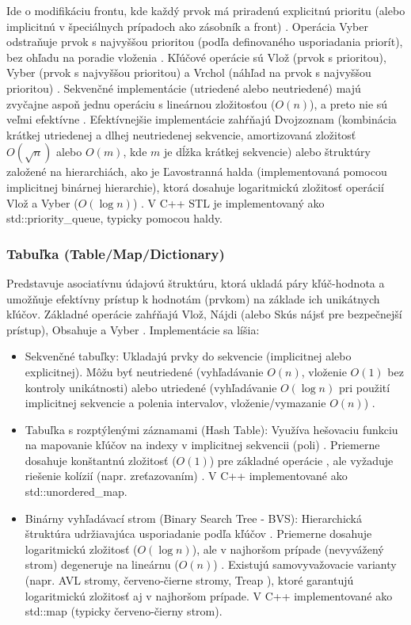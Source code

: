 \documentclass[11pt]{article}
\begin{document}
Ide o modifikáciu frontu, kde každý prvok má priradenú explicitnú prioritu (alebo implicitnú v špeciálnych prípadoch ako zásobník a front) \cite{aus3}. Operácia Vyber odstraňuje prvok s najvyššou prioritou (podľa definovaného usporiadania priorít), bez ohľadu na poradie vloženia \cite{aus3}. Kľúčové operácie sú Vlož (prvok s prioritou), Vyber (prvok s najvyššou prioritou) a Vrchol (náhľad na prvok s najvyššou prioritou) \cite{aus3}. Sekvenčné implementácie (utriedené alebo neutriedené) majú zvyčajne aspoň jednu operáciu s lineárnou zložitosťou ($O(n)$), a preto nie sú veľmi efektívne \cite{aus3}. Efektívnejšie implementácie zahŕňajú Dvojzoznam (kombinácia krátkej utriedenej a dlhej neutriedenej sekvencie, amortizovaná zložitosť $O(\sqrt{n})$ alebo $O(m)$, kde $m$ je dĺžka krátkej sekvencie) \cite{aus3} alebo štruktúry založené na hierarchiách, ako je Ľavostranná halda (implementovaná pomocou implicitnej binárnej hierarchie), ktorá dosahuje logaritmickú zložitosť operácií Vlož a Vyber ($O(\log n)$) \cite{aus3}. V C++ STL je implementovaný ako std::priority\_queue, typicky pomocou haldy.

\subsubsection{Tabuľka (Table/Map/Dictionary)}

Predstavuje asociatívnu údajovú štruktúru, ktorá ukladá páry kľúč-hodnota a umožňuje efektívny prístup k hodnotám (prvkom) na základe ich unikátnych kľúčov. Základné operácie zahŕňajú Vlož, Nájdi (alebo Skús nájsť pre bezpečnejší prístup), Obsahuje a Vyber \cite{aus3}. Implementácie sa líšia:
  \begin{itemize}
    \item Sekvenčné tabuľky: Ukladajú prvky do sekvencie (implicitnej alebo explicitnej). Môžu byť neutriedené (vyhľadávanie $O(n)$, vloženie $O(1)$ bez kontroly unikátnosti) alebo utriedené (vyhľadávanie $O(\log n)$ pri použití implicitnej sekvencie a polenia intervalov, vloženie/vymazanie $O(n)$) \cite{aus3}.
    \item Tabuľka s rozptýlenými záznamami (Hash Table): Využíva hešovaciu funkciu na mapovanie kľúčov na indexy v implicitnej sekvencii (poli) \cite{aus3}. Priemerne dosahuje konštantnú zložitosť ($O(1)$) pre základné operácie \cite{aus3}, ale vyžaduje riešenie kolízií (napr. zreťazovaním) \cite{aus3}. V C++ implementované ako std::unordered\_map.
    \item Binárny vyhľadávací strom (Binary Search Tree - BVS): Hierarchická štruktúra udržiavajúca usporiadanie podľa kľúčov \cite{aus3}. Priemerne dosahuje logaritmickú zložitosť ($O(\log n)$), ale v najhoršom prípade (nevyvážený strom) degeneruje na lineárnu ($O(n)$) \cite{aus3}. Existujú samovyvažovacie varianty (napr. AVL stromy, červeno-čierne stromy, Treap \cite{aus3}), ktoré garantujú logaritmickú zložitosť aj v najhoršom prípade. V C++ implementované ako std::map (typicky červeno-čierny strom).
  \end{itemize}
\end{document}
